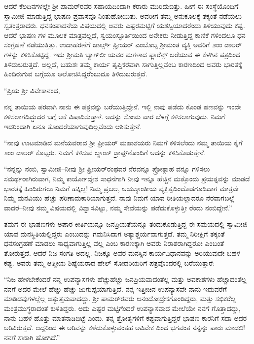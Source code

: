 ಆದರೆ ಕೆಲದಿನಗಳಲ್ಲೇ ಶ್ರೀ ಪಾಮರ್​ರವರ ಸಹಾಯದಿಂದಾಗಿ ಕರಾರು ಮುರಿದುಬಿತ್ತು. ಹೀಗೆ ಈ ಸಂಸ್ಥೆಯೊಂದಿಗೆ ಸ್ವಾಮೀಜಿ ಮಾಡುತ್ತಿದ್ದ ಭಾಷಣ ಪ್ರವಾಸವೂ ನಿಂತುಹೋಯಿತು. ಅವರೀಗ ತಮ್ಮ ಅನುಕೂಲಕ್ಕೆ ತಕ್ಕಂತೆ ನಡೆಯಲು ಸ್ವತಂತ್ರರಾದರು. ಧನಸಂಪಾದನೆಯ ವಿಷಯದಲ್ಲಿ ಅವರು ಎಷ್ಟರಮಟ್ಟಿಗೆ ಯಶಸ್ವಿಯಾದರೆಂದು ತಿಳಿಯುವುದು ಕಷ್ಟ. ಆದರೆ ಭಾಷಣ ಗಳ ಮೂಲಕ ಮಾತ್ರವಲ್ಲದೆ, ಸ್ವಯಂಸ್ಫೂರ್ತಿಯಿಂದ ಅನೇಕರು ನೀಡುತ್ತಿದ್ದ ಕಾಣಿಕೆ ಗಳಿಂದಲೂ ಧನ ಸಂಗ್ರಹಣೆ ನಡೆಯುತ್ತಿತ್ತು. ಉದಾಹರಣೆಗೆ ಚಾರ್ಲ್ಸ್ ಫ್ರೀಯರ್ ಎಂಬೊಬ್ಬ ಶ್ರೀಮಂತ ವ್ಯಕ್ತಿ ಅವರಿಗೆ ೨ಂಂ ಡಾಲರ್​ಗಳನ್ನು ಕಳಿಸಿಕೊಟ್ಟಿದ್ದ. ಇದು ಶ್ರೀಮತಿ ಬ್ಯಾಗ್​ಲೀ ಯವರ ಮಗಳಾದ ಫ್ಲಾರೆನ್ಸ್ ಬರೆಯುವ ಈ ಕೆಳಗಿನ ಪತ್ರದಿಂದ ತಿಳಿದುಬರುತ್ತದೆ. ಅಲ್ಲದೆ, ಬಹುಶಃ ತಮ್ಮ ಕಾರ್ಯ ತೃಪ್ತಿಕರವಾಗಿ ಸಾಗುತ್ತಿಲ್ಲವೆಂಬ ಕಾರಣದಿಂದ ಅವರು ಭಾರತಕ್ಕೆ ಹಿಂದಿರುಗುವ ಬಗ್ಗೆಯೂ ಆಲೋಚಿಸಿದ್ದರೆಂಬುದೂ ತಿಳಿದುಬರುತ್ತದೆ.

“ಪ್ರಿಯ ಶ್ರೀ ವಿವೇಕಾನಂದ,

ನನ್ನ ತಾಯಿಯ ಪರವಾಗಿ ನಾನು ಈ ಪತ್ರವನ್ನು ಬರೆಯುತ್ತಿದ್ದೇನೆ. ಇಲ್ಲಿ ನಾವು ಪಡೆದು ಕೊಂಡ ಹಣವನ್ನು ಇಂದೇ ಕಳಿಸಲಾಗದಿದ್ದುದರ ಬಗ್ಗೆ ಆಕೆ ವಿಷಾದಿಸುತ್ತಾಳೆ. ಅದನ್ನು ಸೋಮ ವಾರ ಬೆಳಗ್ಗೆ ಕಳಿಸಲಾಗುವುದು. ನಿಮಗೆ ಇದರಿಂದಾಗಿ ಏನೂ ತೊಂದರೆಯಾಗುವುದಿಲ್ಲವೆಂದು ಆಶಿಸುತ್ತೇನೆ.

“ನಾವು ಊಟಮಾಡಿದ ಮನೆಯವರಾದ ಶ್ರೀ ಫ್ರೀಯರ್ ಮಹಾಶಯರು ನಿಮಗೆ ಕಳಿಸಲೆಂದು ನಮ್ಮ ತಾಯಿಯ ಕೈಗೆ ೨ಂಂ ಡಾಲರ್ ಕೊಟ್ಟರು. ನಿಮಗೆ ಕಳಿಸುವ ಬ್ಯಾಂಕ್ ಡ್ರಾಫ್ಟ್​ನೊಂದಿಗೆ ಅದನ್ನು ಕಳಿಸಿಕೊಡುತ್ತೇನೆ.

“ನನ್ನನ್ನು ನಂಬಿ, ಸ್ವಾಮೀಜಿ–ನೀವು ಶ್ರೀ ಫ್ರೀಯರ್​ರಂಥವರ ನೆರವನ್ನೂ ಪ್ರೋತ್ಸಾಹ ವನ್ನೂ ಗಳಿಸಲು ಸಮರ್ಥರಾಗಿರುವಾಗ, ನಿಮ್ಮ ಕಾರ್ಯೋದ್ದೇಶ ಸಾಧನೆಗಾಗಿ ನೀವು ಇನ್ನೂ ಹೆಚ್ಚಿನ ಮತ್ತೊಂದು ಪ್ರಯತ್ನವನ್ನು ಮಾಡದೆ ಭಾರತಕ್ಕೆ ಹಿಂದಿರುಗಲು ನಿಮಗೆ ಹಕ್ಕಿಲ್ಲ! ನಿಮ್ಮ ಪ್ರಬಲ, ಅಯಸ್ಕಾಂತೀಯ ವ್ಯಕ್ತಿತ್ವದಿಂದೊಡಗೂಡಿದಾಗ ಮಾತ್ರವೇ ನಿಮ್ಮ ಮನವಿಯು ಹೆಚ್ಚು ಪರಿಣಾಮಕಾರಿಯಾಗುತ್ತದೆ. ನಾವು ನಿಮಗೆ ಯಾವ ರೀತಿಯಲ್ಲಾದರೂ ನೆರವಾಗಬಲ್ಲೆ ವಾದರೆ–ನೀವು ನಮ್ಮ ವಿಷಯದಲ್ಲಿ ವಿಶ್ವಾಸವಿಟ್ಟು, ನಮ್ಮ ಸೇವೆಯನ್ನು ಪಡೆದುಕೊಳ್ಳುತ್ತೀ ರೆಂದು ನಂಬಿದ್ದೇನೆ.”

ತಮಗೆ ಈ ಭಾಷಣಗಳು ಅಪಾರ ಕೀರ್ತಿಯನ್ನೂ ಜನಪ್ರಿಯತೆಯನ್ನೂ ತಂದುಕೊಡುತ್ತಿದ್ದ ಈ ಸಮಯದಲ್ಲಿ ಸ್ವಾಮೀಜಿ ಯಾವ ಮನಸ್ಥಿತಿಯಲ್ಲಿದ್ದರು ಎಂಬುದನ್ನು ಗಮನಿಸಿದಾಗ ಅತ್ಯಾಶ್ಚರ್ಯವಾಗುತ್ತದೆ. ತಮ್ಮ ನಿರೀಕ್ಷಿಗೆ ತಕ್ಕಂತೆ ಧನಸಂಗ್ರಹಣೆ ಮಾಡಲು ಸಾಧ್ಯವಾಗುತ್ತಿಲ್ಲ ವಲ್ಲ ಎಂಬ ಕಾರಣಕ್ಕಾಗಿ ಅವರು ನಿರಾಶರಾಗಿದ್ದರೋ ಎಂಬಂತೆ ತೋರುತ್ತದೆ. ಆದರೆ ನಿಜ ಸಂಗತಿ ಅದಲ್ಲ. ನಿಜಕ್ಕೂ ಅವರ ಮನಸ್ಸಿನ ಕಾರ್ಯವಿಧಾನವನ್ನು ಅರಿಯುವುದೇ ಬಹಳ ಕಷ್ಟ. ಅವರು ತಮ್ಮ ಆತ್ಮೀಯ ಶಿಷ್ಯೆಯರಾದ ಹೇಲ್ ಸೋದರಿಯರಿಗೆ ಪತ್ರವೊಂದರಲ್ಲಿ ಬರೆಯುತ್ತಾರೆ:

“ನಿಜ ಹೇಳಬೇಕೆಂದರೆ ನನ್ನ ಉಪನ್ಯಾಸಗಳು ಹೆಚ್ಚುಹೆಚ್ಚು ಜನಪ್ರಿಯವಾದಂತೆಲ್ಲ ಮತ್ತು ಅವಕಾಶಗಳು ಹೆಚ್ಚಾದಂತೆಲ್ಲ ನನಗೆ ಅದರ ಮೇಲೆ ಹೆಚ್ಚು ಹೆಚ್ಚು ಜುಗುಪ್ಸೆಯಾಗುತ್ತಿದೆ. ನನ್ನ ಇತ್ತೀಚಿನ ಉಪನ್ಯಾಸವೇ ನಾನು ಇದುವರೆಗೆ ಮಾಡಿದವುಗಳಲ್ಲೆಲ್ಲ ಅತ್ಯುತ್ತಮವಾದದ್ದು. ಶ್ರೀ ಪಾಮರ್​ರವರು ಆನಂದೋದ್ರೇಕಗೊಂಡಿದ್ದರು, ಮತ್ತು ಸಭಿಕರೆಲ್ಲ ಮಂತ್ರಮುಗ್ಧರಾದಂತೆ ಕುಳಿತಿದ್ದರು. ಅದು ಎಷ್ಟರ ಮಟ್ಟಿಗೆಂದರೆ ಉಪನ್ಯಾಸವಾದ ಮೇಲೆಯೇ ನನಗೆ ಗೊತ್ತಾದದ್ದು, ನಾನು ಬಹಳ ಹೊತ್ತು ಮಾತನಾಡಿಬಿಟ್ಟೆ ಎಂದು. ತನ್ನ ಶ್ರೋತೃಗಳಿಗೆ ಕಷ್ಟವಾಗುತ್ತಿದ್ದರೆ ಭಾಷಣ ಕಾರನಿಗೆ ಸದಾ ಅದರ ಅರಿವಿರುತ್ತದೆ. ಆದ್ದರಿಂದ ಈ ಅರಿವನ್ನು ಕಳೆದುಕೊಳ್ಳುವಂತಹ ಅವಿವೇಕ ದಿಂದ ಭಗವಂತ ನನ್ನನ್ನು ಪಾರು ಮಾಡಲಿ! ನನಗೆ ಸಾಕಾಗಿ ಹೋಗಿದೆ.”

